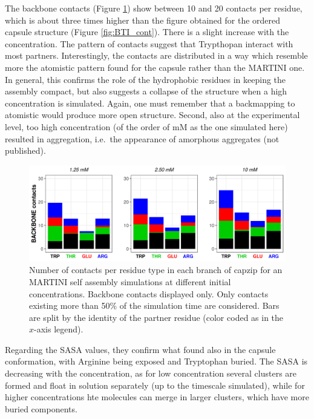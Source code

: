 The backbone contacts (Figure \ref{fig:SA_contacts}) show between 10 and 20 contacts per residue, which is about three times higher than the figure obtained for the ordered capsule structure (Figure \ref{fig:BTI_cont}). There is a slight increase with the concentration. The pattern of contacts suggest that Trypthopan interact with most partners. Interestingly, the contacts are distributed in a way which resemble more the atomistic pattern found for the capsule rather than the MARTINI one. In general, this confirms the role of the hydrophobic residues in keeping the assembly compact, but also suggests a collapse of the structure when a high concentration is simulated. Again, one must remember that a backmapping to atomistic would produce more open structure. Second, also at the experimental level, too high concentration (of the order of mM as the one simulated here) resulted in aggregation, i.e.\ the appearance of amorphous aggregates (not published).
%
\begin{figure}[t!]
\centering\includegraphics[width=0.95\linewidth]{3results_capsule/pics/contacts_SA.png} 
\caption[Self-assembly simulations: contacts]{Number of contacts per residue type in each branch of capzip for an MARTINI self assembly simulations at different initial concentrations. Backbone contacts displayed only. Only contacts existing more than 50\% of the simulation time are considered. Bars are split by the identity of the partner residue (color coded as in the $x$-axis legend).}
\label{fig:SA_contacts}
\end{figure}
%
Regarding the SASA values, they confirm what found also in the capsule conformation, with Arginine being exposed and Tryptophan buried. The SASA is decreasing with the concentration, as for low concentration several clusters are formed and float in solution separately (up to the timescale simulated), while for higher concentrations hte molecules can merge in larger clusters, which have more buried components.
%

